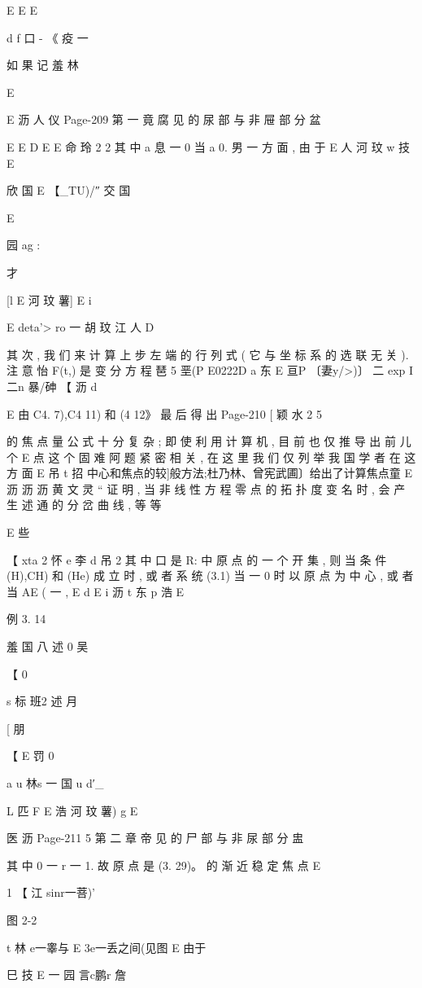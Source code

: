 {{{{{{{{{{{{E
E
E

d
f 口 - 《 疫 一

如 果 记
羞 林

E

E 沥 人 仪
Page-209
第 一 竟 腐 见 的 尿 部 与 非 屉 部 分 盆

E E
D
E
E 命 玲 2 2
其 中 a 息 一 0 当 a 0. 男 一 方 面 , 由 于
E 人 河 玟 w
技
E

欣 国
E 【_TU)/″ 交 国

E

园
ag :

才

[l E 河 玟 薯]
E i

E
deta'> ro 一 胡 玟 江 人 D

其 次 , 我 们 来 计 算 上 步 左 端 的 行 列 式 ( 它 与 坐 标 系 的 选 联 无 关 ). 注
意 怡 F(t,) 是 变 分 方 程
琶 5 垩(P E0222D
a 东
E 亘P 〔妻y/>)〕 二 exp I二n 暴/砷 【 沥 d

E
由 C4. 7),C4 11) 和 (4 12》 最 后 得 出
Page-210
[ 颖 水 2 5

的 焦 点 量 公 式 十 分 复 杂 ; 即 使 利 用 计 算 机 , 目 前 也 仅 推 导 出 前 儿 个
E
点 这 个 固 难 阿 题 紧 密 相 关 , 在 这 里 我 们 仅 列 举 我 国 学 者 在 这 方 面
E 吊 t 招
中心和焦点的较]般方法;杜乃林、曾宪武圃〕给出了计算焦点童
E 沥 沥
沥
黄 文 灵 “ 证 明 , 当 非 线 性 方 程 零 点 的 拓 扑 度 变 名 时 , 会 产 生 述 通
的 分 岔 曲 线 , 等 等

E 些

【 xta 2 怀 e 李 d 吊 2
其 中 口 是 R: 中 原 点 的 一 个 开 集 , 则 当 条 件 (H),CH) 和 (He) 成
立 时 , 或 者 系 统 (3.1) 当 一 0 时 以 原 点 为 中 心 , 或 者 当 AE ( 一 ,
E
d
E i 沥 t 东 p 浩
E

例 3. 14

羞 国 八 述 0 吴

【
0

s 标 班2 述 月

[ 朋

【
E 罚 0

a u 林s 一 国
u
d′_

L 匹
F E 浩 河 玟 薯) g
E

医 沥
Page-211
5 第 二 章 帝 见 的 尸 部 与 非 尿 部 分 盅

其 中 0 一 r 一 1. 故 原 点 是 (3. 29)。 的 渐 近 稳 定 焦 点
E

1
【 江 sinr一菩)'

图 2-2

t 林 e一睾与 E 3e一丢之间(见图
E 由于

巳 技 E 一
园 言c鹏r 詹

}}}}}}}}}}}}
